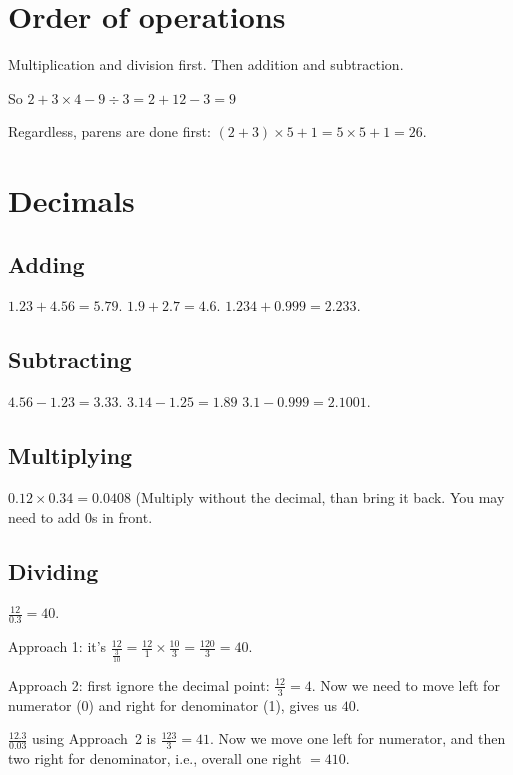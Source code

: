 \documentclass[fullpage,twocolumn]{article}
\begin{document}
\section{Order of operations}

Multiplication and division first. Then addition and subtraction.

So $2 + 3 \times 4 - 9 \div 3 = 2 + 12 - 3 = 9$

Regardless, parens are done first: $(2 + 3 ) \times 5 + 1 = 5 \times 5 + 1 = 26$.

\section{Decimals}

\subsection{Adding}

$1.23 + 4.56 = 5.79$. $1.9 + 2.7 = 4.6$. $1.234 + 0.999 = 2.233$.

\subsection{Subtracting}

$4.56 - 1.23 = 3.33$. $3.14 - 1.25 = 1.89$ $3.1 - 0.999 = 2.1001$.

\subsection{Multiplying}

$0.12 \times 0.34 = 0.0408$ (Multiply without the decimal, than bring it back.
You may need to add 0s in front.

\subsection{Dividing}

$\frac{12}{0.3} = 40$.

Approach 1: it's $\frac{12}{\frac{3}{10}} = \frac{12}{1}\times\frac{10}{3} = \frac{120}{3} = 40$.

Approach 2: first ignore the decimal point: $\frac{12}{3} = 4$. Now we need
to move left for numerator (0) and right for denominator (1), gives us $40$.

$\frac{12.3}{0.03}$ using Approach~2 is $\frac{123}{3} = 41$. Now we move one left
for numerator, and then two right for denominator, i.e., overall one right $ = 410$.
\end{document}
